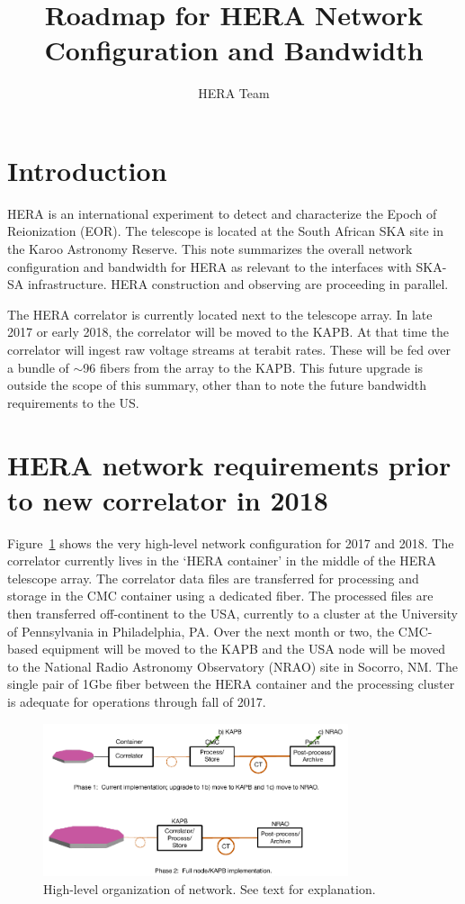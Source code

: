 \documentclass{article}
\begin{document}
\author{HERA Team}
\title{Roadmap for HERA Network Configuration and Bandwidth}
\maketitle

\section{Introduction}
HERA is an international experiment to detect and characterize the Epoch of
Reionization (EOR).  The telescope is located at the South African SKA site in
the Karoo Astronomy Reserve.  This note summarizes the overall network
configuration and bandwidth for HERA as relevant to the interfaces with SKA-SA
infrastructure.  HERA construction and observing are proceeding in parallel.

The HERA correlator is currently located next to the telescope array. In late 2017 or early 2018, the correlator will be moved to the KAPB. At that time the correlator will ingest raw voltage streams at terabit rates. These will be fed over a bundle of $\sim$96 fibers from the array to the KAPB. This future upgrade is outside the scope of this summary, other than to note the future bandwidth requirements to the US.

\section{HERA network requirements prior to new correlator in 2018}
Figure~\ref{fig:hi_level} shows the very high-level network configuration for
2017 and 2018.  The correlator currently lives in the `HERA container' in the
middle of the HERA telescope array.  The correlator data files are transferred for processing and storage in the CMC container using a dedicated fiber.  The processed files are then transferred off-continent to the USA, currently to a cluster at the University of Pennsylvania in Philadelphia, PA.  Over the next month or two, the CMC-based equipment will be moved to the KAPB and the USA node will be moved to the National Radio Astronomy Observatory (NRAO) site in Socorro, NM.  The single pair of 1Gbe fiber between the HERA container and the processing cluster is adequate for operations through fall of 2017.

\begin{figure}[H]
\includegraphics[width=0.8\textwidth]{network.pdf}
\centering
\caption{High-level organization of network.  See text for explanation.}
\label{fig:hi_level}
\end{figure}
\end{document}
